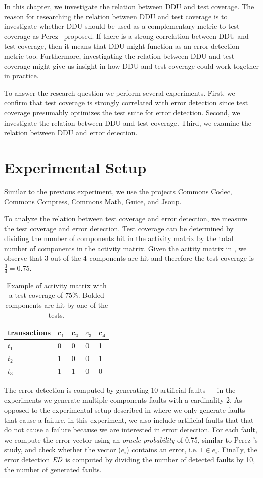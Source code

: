 \documentclass[twoside,a4paper,11pt]{memoir}
\begin{document}
In this chapter, we investigate the relation between DDU and test coverage.
The reason for researching the relation between DDU and test coverage is to investigate whether DDU should be used as a complementary metric to test coverage as Perez \etal\ proposed.
If there is a strong correlation between DDU and test coverage, then it means that DDU might function as an error detection metric too.
Furthermore, investigating the relation between DDU and test coverage might give us insight in how DDU and test coverage could work together in practice.

To answer the research question we perform several experiments.
First, we confirm that test coverage is strongly correlated with error detection since test coverage presumably optimizes the test suite for error detection.
Second, we investigate the relation between DDU and test coverage.
Third, we examine the relation between DDU and error detection.


\section{Experimental Setup}
Similar to the previous experiment, we use the projects Commons Codec, Commons Compress, Commons Math, Guice, and Jsoup.

To analyze the relation between test coverage and error detection, we measure the test coverage and error detection.
Test coverage can be determined by dividing the number of components hit in the activity matrix by the total number of components in the activity matrix.
Given the acitity matrix in , we observe that 3 out of the 4 components are hit and therefore the test coverage is \(\frac{3}{4} = 0.75 \).
\begin{table}[]
\centering
\caption{Example of activity matrix with a test coverage of 75\%. Bolded components are hit by one of the tests.}%
\label{tab:test_coverage}
\begin{tabular}{l|llll}
transactions & \(\mathbf{c_1} \) & \(\mathbf{c_2} \) & \(c_3 \) & \(\mathbf{c_4} \) \\ \hline
\(t_1 \) & 0 & 0 & 0 & 1 \\
\(t_2 \) & 1 & 0 & 0 & 1 \\
\(t_3 \) & 1 & 1 & 0 & 0
\end{tabular}
\end{table}

The error detection is computed by generating 10 artificial faults --- in the experiments we generate multiple components faults with a cardinality 2.
As opposed to the experimental setup described in  where we only generate faults that cause a failure, in this experiment, we also include artificial faults that that do not cause a failure because we are interested in error detection.
For each fault, we compute the error vector using an \emph{oracle probability} of 0.75, similar to Perez \etal's study, and check whether the vector (\(e_i\)) contains an error, i.e. \( 1 \in e_i \).
Finally, the error detection \(\emph{ED}\) is computed by dividing the number of detected faults by 10, the number of generated faults.
\end{document}
